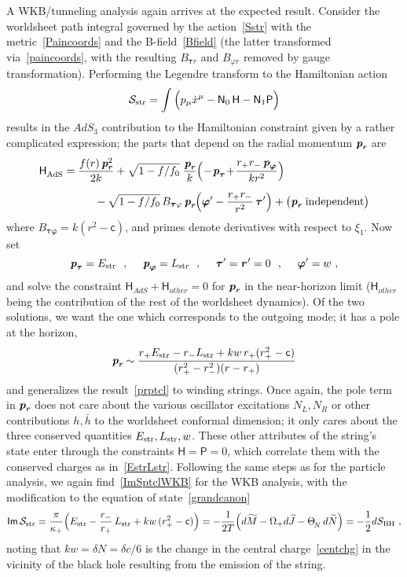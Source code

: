 \documentclass[11pt]{article}
\def\ThetaN{{\Theta^{\vphantom{|}}_{\!N}}}
\def\Mtil{{\widetilde M}}
\def\Jtil{{\widetilde J}}
\def\Ntil{{\widetilde N}}
\def\varphib{{\boldsymbol\varphi}}
\def\taub{{\boldsymbol\tau}}
\def\str{{\rm str}}
\def\BH{{\rm BH}}
\def\mathbi#1{\textbf{\em #1}}
\def\tight#1{\! #1 \!}  %
\def\rbi{{\mathbi r}}
\def\pbi{{\mathbi p}}
\def\[{\left[}
\def\sfH{{\mathsf H}}
\def\sfI{{\mathsf I}}
\def\sfN{{\mathsf N}}
\def\sfP{{\mathsf P}}
\def\sfc{{\mathsf c}}
\def\sfm{{\mathsf m}}
\def\half{\frac12}
\def\Im{{\sfI\sfm\,}}
\def\be{\begin{equation}}
\def\ee{\end{equation}}
\numberwithin{equation}{section}
\def\cS{\mathcal {S}} \def\cT{\mathcal {T}} \def\cU{\mathcal {U}}
\def\half{\frac12}
\begin{document}
A WKB/tunneling analysis again arrives at the expected result.  Consider the worldsheet path integral governed by the action~\eqref{Sstr}
with the metric~\eqref{Paincoords} and the B-field~\eqref{Bfield} (the latter transformed via~\eqref{paincoords}, with the resulting $B_{\taub r}$ and $B_{\varphi r}$ removed by gauge transformation).  Performing the Legendre transform to the Hamiltonian action
\begin{align}
\cS_\str = \int\Big( p_\mu \dot x^\mu - \sfN_0 \,\sfH - \sfN_1 \sfP \Big)
\end{align}
results in the $AdS_3$ contribution to the Hamiltonian constraint given by a rather complicated expression; the parts that depend on the radial momentum $\pbi_\rbi$ are
\begin{align}
\begin{split}
\sfH^{~}_{\rm AdS} &=  \frac{f(r)\,\pbi_\rbi^2}{2k} +\sqrt{1-f/f_0}\; \frac{\pbi_\rbi}{k}\Big(\tight-{\pbi_{\taub}} \tight+\frac{ r_+r_-\,\pbi_\varphib}{kr^2}\Big)
\\[.2cm]
&\hskip1cm
- \sqrt{1-f/f_0}\, B_{\taub \varphi}\, \pbi_\rbi \Big( \varphib'-\frac{r_+r_-}{r^2}\, \taub' \Big) 
+ \big( \pbi_\rbi \textrm{ independent} \big)
\end{split}
\end{align}
where $B_{\taub\varphib}=k(r^2-\sfc)$, and primes denote derivatives with respect to $\xi_1$.
Now set 
\be
\pbi_{\taub} = E_\str 
~~,~~~~
\pbi_\varphib = L _\str
~~,~~~~
\taub'=\rbi^{\,\prime}=0
~~,~~~~
\varphib'=w ~,
\ee
and solve the constraint $\sfH_{\!AdS}+\sfH_{other}=0$ for $\pbi_\rbi$ in the near-horizon limit ($\sfH_{other}$ being the contribution of the rest of the worldsheet dynamics).  Of the two solutions, we want the one which corresponds to the outgoing mode; it has a pole at the horizon, 
\be
\label{prstr}
\pbi_\rbi \sim \frac{   r_+ E_\str -   r_- L_\str +  kw\, r_+(r_+^2-\sfc)}{(r_+^2-r_-^2)(r-r_+)}  
\ee
and generalizes the result~\eqref{prptcl} to winding strings.  Once again, the pole term in $\pbi_\rbi$ does not care about the various oscillator excitations $N_L, N_R$ or other contributions $h,\bar h$ to the worldsheet conformal dimension; it only cares about the three conserved quantities $E_\str,L_\str,w$.  These other attributes of the string's state enter through the constraints $\sfH=\sfP=0$, which correlate them with the conserved charges as in~\eqref{EstrLstr}.
Following the same steps as for the particle analysis, we again find~\eqref{ImSptclWKB} for the WKB analysis, with the modification to the equation of state~\eqref{grandcanon}
\be 
\label{stringamp}
\Im \cS_\str = \frac{\pi}{\kappa_+}\Big( E_\str  -  \frac{r_-}{r_+} \, L_\str +  kw\,({r_+^2 - \sfc})\Big) 
= -\frac{1}{2T}\Big({d \Mtil -\Omega_+ d \Jtil  - \ThetaN \,d\Ntil }\Big)  = -\half  {d S_\BH} ~,
\ee
noting that $kw = \delta N =  \delta c/6$ is the change in the central charge~\eqref{centchg} in the vicinity of the black hole resulting from the emission of the string.
\end{document}
